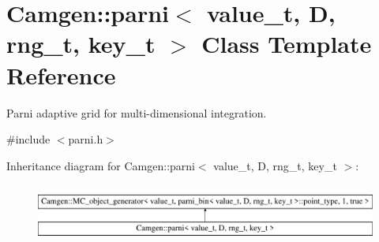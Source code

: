 \hypertarget{a00384}{\section{Camgen\-:\-:parni$<$ value\-\_\-t, D, rng\-\_\-t, key\-\_\-t $>$ Class Template Reference}
\label{a00384}
}


Parni adaptive grid for multi-\/dimensional integration.  




{\ttfamily \#include $<$parni.\-h$>$}

Inheritance diagram for Camgen\-:\-:parni$<$ value\-\_\-t, D, rng\-\_\-t, key\-\_\-t $>$\-:\begin{figure}[H]
\begin{center}
\leavevmode
\includegraphics[height=1.888702cm]{a00384}
\end{center}
\end{figure}
